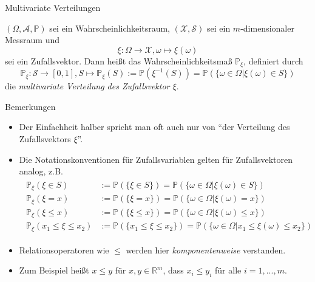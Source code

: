\documentclass[
  8pt,
  ignorenonframetext,
]{beamer}
\providecommand{\tightlist}{%
  \setlength{\itemsep}{0pt}\setlength{\parskip}{0pt}}
\begin{document}
\begin{frame}{Multivariate Verteilungen}
\protect\hypertarget{multivariate-verteilungen-3}{}
\footnotesize
\begin{definition}
\justifying
$(\Omega, \mathcal{A}, \mathbb{P})$ sei ein Wahrscheinlichkeitsraum,
$(\mathcal{X},\mathcal{S})$ sei ein $m$-dimensionaler Messraum und
\begin{equation}
\xi : \Omega \to \mathcal{X}, \omega \mapsto \xi(\omega)
\end{equation}
sei ein Zufallsvektor. Dann heißt das Wahrscheinlichkeitsmaß $\mathbb{P}_\xi$,
definiert durch
\begin{equation}
\mathbb{P}_\xi : \mathcal{S} \to [0,1], S \mapsto \mathbb{P}_\xi(S)
:= \mathbb{P}(\xi^{-1}(S))
 = \mathbb{P}\left(\{\omega \in \Omega|\xi(\omega) \in S\}\right)
\end{equation}
die \textit{multivariate Verteilung des Zufallsvektor $\xi$}.
\end{definition}
\footnotesize

Bemerkungen

\begin{itemize}
\tightlist
\item
  Der Einfachheit halber spricht man oft auch nur von ``der Verteilung
  des Zufallsvektors \(\xi\)''.
\item
  Die Notationskonventionen für Zufallsvariablen gelten für
  Zufallsvektoren analog, z.B. \begin{align}
  \begin{split}
  \mathbb{P}_\xi(\xi \in S)
  & := \mathbb{P}\left(\{\xi \in S\} \right)
  = \mathbb{P}\left(\{\omega \in \Omega|\xi(\omega) \in S\} \right)
  \\
  \mathbb{P}_\xi(\xi = x)
  & := \mathbb{P}\left(\{\xi = x\} \right)
  = \mathbb{P}\left(\{\omega \in \Omega|\xi(\omega) = x\} \right)
  \\
  \mathbb{P}_\xi(\xi \le x)
  & := \mathbb{P}\left(\{\xi \le x\} \right)
  = \mathbb{P}\left(\{\omega \in \Omega|\xi(\omega) \le x\} \right)
  \\
  \mathbb{P}_\xi(x_1 \le \xi \le x_2)
  & := \mathbb{P}\left(\{x_1 \le \xi \le x_2\} \right)
   = \mathbb{P}\left(\{\omega \in \Omega|x_1 \le \xi(\omega) \le x_2\} \right)
  \end{split}
  \end{align}
\item
  Relationsoperatoren wie \(\le\) werden hier \textit{komponentenweise}
  verstanden.
\item
  Zum Beispiel heißt \(x \le y\) für \(x,y \in \mathbb{R}^m\), dass
  \(x_i \le y_i\) für alle \(i = 1,...,m\).
\end{itemize}
\end{frame}
\end{document}
